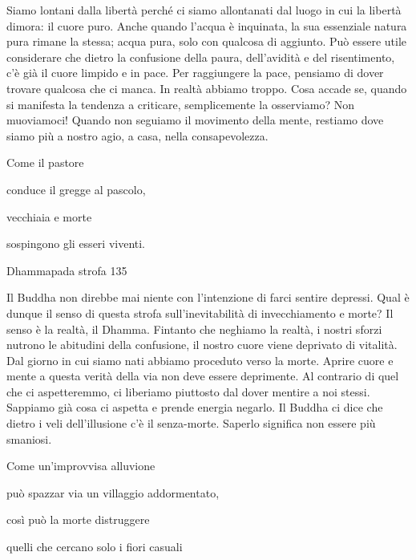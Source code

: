 \documentclass[a4paper,portrait,12pt]{article}
\begin{document}
\newpage



Siamo lontani dalla libert\`{a} perch\'{e} ci siamo allontanati dal luogo in cui la libert\`{a} dimora: il cuore puro. Anche quando l'acqua \`{e} inquinata, la sua essenziale natura pura rimane la stessa; acqua pura, solo con qualcosa di aggiunto. Pu\`{o} essere utile considerare che dietro la confusione della paura, dell'avidit\`{a} e del risentimento, c'\`{e} gi\`{a} il cuore limpido e in pace. Per raggiungere la pace, pensiamo di dover trovare qualcosa che ci manca. In realt\`{a} abbiamo troppo. Cosa accade se, quando si manifesta la tendenza a criticare, semplicemente la osserviamo? Non muoviamoci! Quando non seguiamo il movimento della mente, restiamo dove siamo più a nostro agio, a casa, nella consapevolezza. 


\newpage



Come il pastore


conduce il gregge al pascolo,


vecchiaia e morte


sospingono gli esseri viventi.





Dhammapada strofa 135


\newpage



Il Buddha non direbbe mai niente con l'intenzione di farci sentire depressi. Qual \`{e} dunque il senso di questa strofa sull'inevitabilit\`{a} di invecchiamento e morte? Il senso \`{e} la realt\`{a}, il Dhamma. Fintanto che neghiamo la realt\`{a}, i nostri sforzi nutrono le abitudini della confusione, il nostro cuore viene deprivato di vitalit\`{a}. Dal giorno in cui siamo nati abbiamo proceduto  verso la morte. Aprire cuore e mente a questa verit\`{a} della via non deve essere deprimente. Al contrario di quel che ci aspetteremmo,  ci liberiamo piuttosto dal dover mentire a noi stessi. Sappiamo gi\`{a} cosa ci aspetta e prende energia negarlo. Il Buddha ci dice che dietro i veli dell'illusione c'\`{e} il senza-morte. Saperlo significa non essere più smaniosi.


\newpage



Come un'improvvisa alluvione


pu\`{o} spazzar via un villaggio addormentato,


così pu\`{o} la morte distruggere


quelli che cercano solo i fiori casuali
\end{document}
